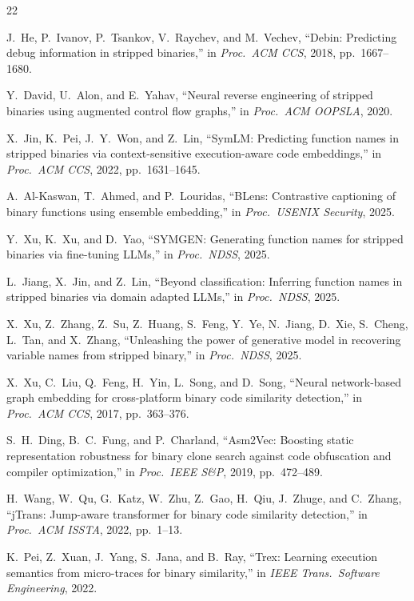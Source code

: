 \documentclass[sigconf,nonacm]{acmart}
\begin{document}

{\small
\begin{thebibliography}{22}

J.~He, P.~Ivanov, P.~Tsankov, V.~Raychev, and M.~Vechev, ``Debin: Predicting debug information in stripped binaries,'' in \emph{Proc.\ ACM CCS}, 2018, pp.~1667--1680.

Y.~David, U.~Alon, and E.~Yahav, ``Neural reverse engineering of stripped binaries using augmented control flow graphs,'' in \emph{Proc.\ ACM OOPSLA}, 2020.

X.~Jin, K.~Pei, J.~Y.~Won, and Z.~Lin, ``SymLM: Predicting function names in stripped binaries via context-sensitive execution-aware code embeddings,'' in \emph{Proc.\ ACM CCS}, 2022, pp.~1631--1645.

A.~Al-Kaswan, T.~Ahmed, and P.~Louridas, ``BLens: Contrastive captioning of binary functions using ensemble embedding,'' in \emph{Proc.\ USENIX Security}, 2025.

Y.~Xu, K.~Xu, and D.~Yao, ``SYMGEN: Generating function names for stripped binaries via fine-tuning LLMs,'' in \emph{Proc.\ NDSS}, 2025.

L.~Jiang, X.~Jin, and Z.~Lin, ``Beyond classification: Inferring function names in stripped binaries via domain adapted LLMs,'' in \emph{Proc.\ NDSS}, 2025.

X.~Xu, Z.~Zhang, Z.~Su, Z.~Huang, S.~Feng, Y.~Ye, N.~Jiang, D.~Xie, S.~Cheng, L.~Tan, and X.~Zhang, ``Unleashing the power of generative model in recovering variable names from stripped binary,'' in \emph{Proc.\ NDSS}, 2025.

X.~Xu, C.~Liu, Q.~Feng, H.~Yin, L.~Song, and D.~Song, ``Neural network-based graph embedding for cross-platform binary code similarity detection,'' in \emph{Proc.\ ACM CCS}, 2017, pp.~363--376.

S.~H.~Ding, B.~C.~Fung, and P.~Charland, ``Asm2Vec: Boosting static representation robustness for binary clone search against code obfuscation and compiler optimization,'' in \emph{Proc.\ IEEE S\&P}, 2019, pp.~472--489.

H.~Wang, W.~Qu, G.~Katz, W.~Zhu, Z.~Gao, H.~Qiu, J.~Zhuge, and C.~Zhang, ``jTrans: Jump-aware transformer for binary code similarity detection,'' in \emph{Proc.\ ACM ISSTA}, 2022, pp.~1--13.

K.~Pei, Z.~Xuan, J.~Yang, S.~Jana, and B.~Ray, ``Trex: Learning execution semantics from micro-traces for binary similarity,'' in \emph{IEEE Trans.\ Software Engineering}, 2022.


\end{thebibliography}}
\end{document}
